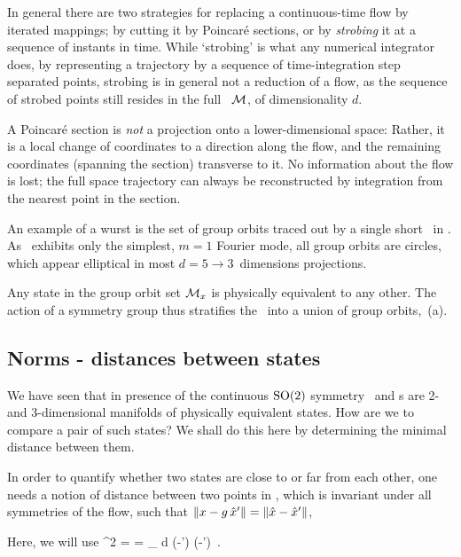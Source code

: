 In general there are two strategies for replacing a continuous-time flow
by iterated mappings; by cutting it by Poincar\'e sections, or by
\emph{strobing} it at a sequence of instants in time. While
`strobing' is what any numerical integrator does, by representing a
trajectory by a sequence of time-integration step separated points,
strobing is in general not a reduction of a flow, as the sequence of
strobed points still resides in the full \statesp\ ${\cal M}$, of
dimensionality $d$.

A Poincar\'e section is {\em not} a projection onto a lower-dimensional
space: Rather, it is a local change of coordinates to a direction along
the flow, and the remaining coordinates (spanning the section) transverse
to it. No information about the flow is lost; the full space trajectory
can always be reconstructed by integration from the nearest point in the
section.


An example of a wurst is the set of group orbits traced out by a single
short \rpo\ in . As \cLe\ exhibits only the simplest,
$m=1$ Fourier mode, all group orbits are circles, which appear elliptical in
most $d=5 \to 3$~dimensions projections.
    \color{black}\fi

Any state in the  group orbit set ${\cal M}_{x}$
is physically equivalent to any other. The action of a symmetry group
thus stratifies the \statesp\ into a union of group orbits,
\,{(a)}.

\subsection{Norms - distances between states}

We have seen that in presence of the continuous $\textrm{SO}(2)$ symmetry
\reqva\ and \rpo s are 2- and 3-dimensional manifolds of physically
equivalent states. How are we to compare a pair of such states? We shall
do this here by determining the minimal distance between them.

In order to quantify
whether two states are close to or far from each other, one
needs a notion of distance between two points in \statesp, which 
is invariant under all symmetries of the flow, such that
$\|{x-g\,{\hat{x}'}}\|=\|{\hat{x}-{\hat{x}'}}\|$, 

Here, we will use
\beq
  ^2  =  =
\int_\bCell \! d \bx \;
(-') \cdot (-')
\,.

